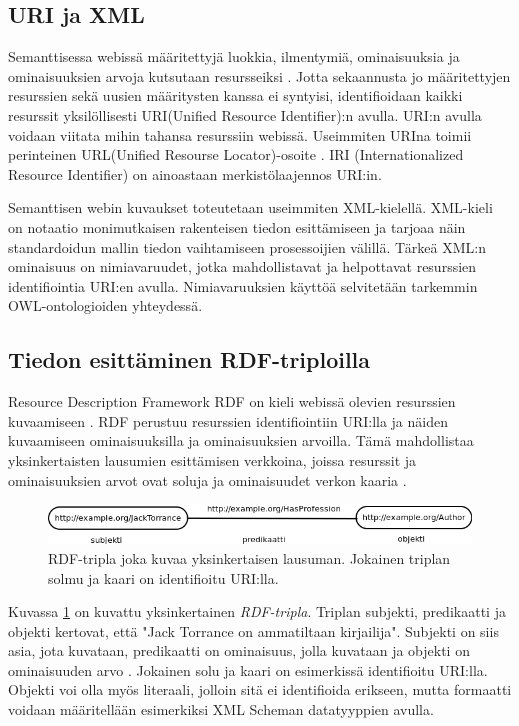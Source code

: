 \documentclass[finnish]{tktltiki2}
\theoremstyle{definition}
\theoremstyle{remark}
\begin{document}
\subsection{URI ja XML}

Semanttisessa webissä määritettyjä luokkia, ilmentymiä, ominaisuuksia ja ominaisuuksien
arvoja kutsutaan resursseiksi \cite{BHL01}. Jotta sekaannusta jo määritettyjen resurssien
sekä uusien määritysten kanssa ei syntyisi, identifioidaan kaikki resurssit
yksilöllisesti URI(Unified Resource Identifier):n avulla.
URI:n avulla voidaan viitata mihin tahansa resurssiin webissä. Useimmiten
URIna toimii perinteinen URL(Unified Resourse Locator)-osoite \cite{BHL01}. IRI
(Internationalized Resource Identifier) on ainoastaan merkistölaajennos URI:in.
 
 Semanttisen webin kuvaukset toteutetaan useimmiten XML-kielellä.
XML-kieli on notaatio monimutkaisen rakenteisen tiedon esittämiseen ja
tarjoaa näin standardoidun mallin tiedon vaihtamiseen prosessoijien välillä.
Tärkeä XML:n ominaisuus on nimiavaruudet, jotka mahdollistavat ja helpottavat resurssien
identifiointia URI:en avulla. Nimiavaruuksien käyttöä selvitetään tarkemmin
OWL-ontologioiden yhteydessä. 

\subsection{Tiedon esittäminen RDF-triploilla}

Resource Description Framework RDF on kieli webissä olevien resurssien
kuvaamiseen \cite{RDFP}. 
RDF perustuu resurssien identifiointiin URI:lla ja näiden kuvaamiseen 
ominaisuuksilla ja ominaisuuksien arvoilla. Tämä mahdollistaa yksinkertaisten
lausumien esittämisen verkkoina, joissa resurssit ja ominaisuuksien arvot ovat soluja ja
ominaisuudet verkon 
kaaria \cite{RDFP}. %

\begin{figure}[h]
 \centering
 \includegraphics[scale=0.50]{JackTorrance.png}
 \caption{RDF-tripla joka kuvaa yksinkertaisen lausuman. Jokainen triplan solmu
ja kaari on identifioitu URI:lla. }
 \label{jack}
\end{figure}

Kuvassa \ref{jack} on kuvattu yksinkertainen \textit{RDF-tripla}.
Triplan subjekti, predikaatti ja objekti kertovat, että "Jack Torrance on ammatiltaan
kirjailija". Subjekti on siis asia, jota kuvataan, predikaatti on ominaisuus, jolla 
kuvataan ja objekti on ominaisuuden arvo \cite{RDFP}. 
Jokainen solu ja kaari on esimerkissä identifioitu URI:lla. Objekti voi olla
myös literaali, jolloin 
sitä ei identifioida erikseen, mutta formaatti voidaan määritellään esimerkiksi XML Scheman
datatyyppien avulla. 
\end{document}
